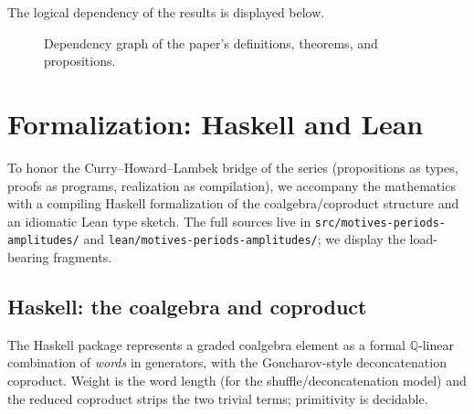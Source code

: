 \documentclass[12pt]{article}
\theoremstyle{definition}
\theoremstyle{remark}
\newcommand{\Qbb}{\mathbb{Q}}
\begin{document}
The logical dependency of the results is displayed below.

\begin{figure}[ht]
\centering
{}
\caption{Dependency graph of the paper's definitions, theorems, and propositions.}
\label{fig:deps}
\end{figure}

\section{Formalization: Haskell and Lean}
\label{sec:formalization}

\begin{sloppypar}
To honor the Curry--Howard--\allowbreak Lambek bridge of the series (propositions as types,
proofs as programs, realization as compilation), we accompany the mathematics with a compiling
Haskell formalization of the coalgebra/coproduct structure and an idiomatic Lean type sketch.
The full sources live in
\texttt{src/\allowbreak motives-\allowbreak periods-\allowbreak amplitudes/} and
\texttt{lean/\allowbreak motives-\allowbreak periods-\allowbreak amplitudes/}; we display the
load-bearing fragments.
\end{sloppypar}

\subsection{Haskell: the coalgebra and coproduct}

The Haskell package represents a graded coalgebra element as a formal $\Qbb$-linear
combination of \emph{words} in generators, with the Goncharov-style deconcatenation coproduct.
Weight is the word length (for the shuffle/deconcatenation model) and the reduced coproduct
strips the two trivial terms; primitivity is decidable.
\end{document}
